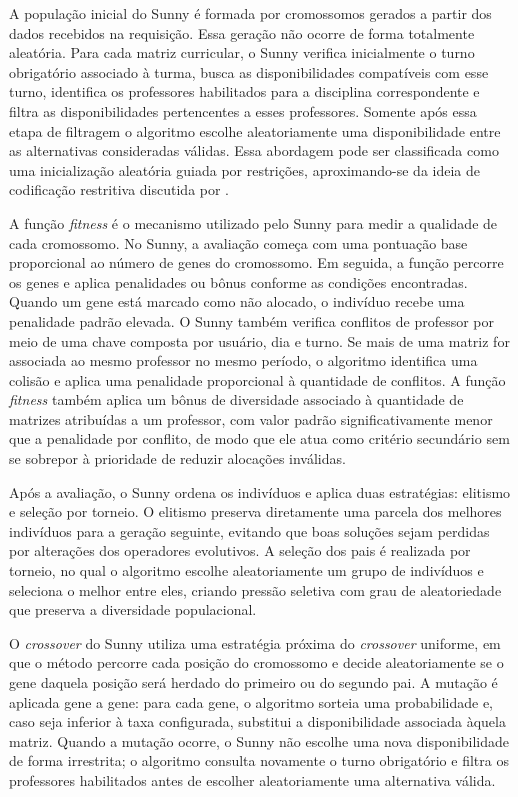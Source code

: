 A população inicial do Sunny é formada por cromossomos gerados a partir dos dados recebidos na requisição. Essa geração não ocorre de forma totalmente aleatória. Para cada matriz curricular, o Sunny verifica inicialmente o turno obrigatório associado à turma, busca as disponibilidades compatíveis com esse turno, identifica os professores habilitados para a disciplina correspondente e filtra as disponibilidades pertencentes a esses professores. Somente após essa etapa de filtragem o algoritmo escolhe aleatoriamente uma disponibilidade entre as alternativas consideradas válidas. Essa abordagem pode ser classificada como uma inicialização aleatória guiada por restrições, aproximando-se da ideia de codificação restritiva discutida por .

A função \textit{fitness} é o mecanismo utilizado pelo Sunny para medir a qualidade de cada cromossomo. No Sunny, a avaliação começa com uma pontuação base proporcional ao número de genes do cromossomo. Em seguida, a função percorre os genes e aplica penalidades ou bônus conforme as condições encontradas. Quando um gene está marcado como não alocado, o indivíduo recebe uma penalidade padrão elevada. O Sunny também verifica conflitos de professor por meio de uma chave composta por usuário, dia e turno. Se mais de uma matriz for associada ao mesmo professor no mesmo período, o algoritmo identifica uma colisão e aplica uma penalidade proporcional à quantidade de conflitos. A função \textit{fitness} também aplica um bônus de diversidade associado à quantidade de matrizes atribuídas a um professor, com valor padrão significativamente menor que a penalidade por conflito, de modo que ele atua como critério secundário sem se sobrepor à prioridade de reduzir alocações inválidas.

Após a avaliação, o Sunny ordena os indivíduos e aplica duas estratégias: elitismo e seleção por torneio. O elitismo preserva diretamente uma parcela dos melhores indivíduos para a geração seguinte, evitando que boas soluções sejam perdidas por alterações dos operadores evolutivos. A seleção dos pais é realizada por torneio, no qual o algoritmo escolhe aleatoriamente um grupo de indivíduos e seleciona o melhor entre eles, criando pressão seletiva com grau de aleatoriedade que preserva a diversidade populacional.

O \textit{crossover} do Sunny utiliza uma estratégia próxima do \textit{crossover} uniforme, em que o método percorre cada posição do cromossomo e decide aleatoriamente se o gene daquela posição será herdado do primeiro ou do segundo pai. A mutação é aplicada gene a gene: para cada gene, o algoritmo sorteia uma probabilidade e, caso seja inferior à taxa configurada, substitui a disponibilidade associada àquela matriz. Quando a mutação ocorre, o Sunny não escolhe uma nova disponibilidade de forma irrestrita; o algoritmo consulta novamente o turno obrigatório e filtra os professores habilitados antes de escolher aleatoriamente uma alternativa válida.

